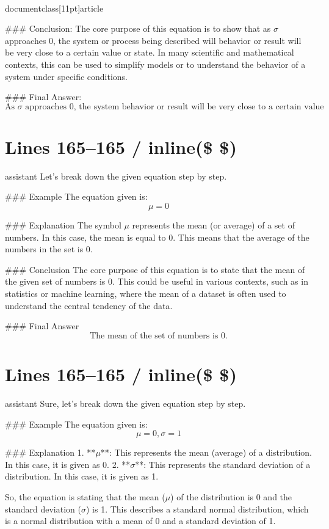 \\documentclass[11pt]{article}
\begin{document}
### Conclusion:
The core purpose of this equation is to show that as \(\sigma\) approaches 0, the system or process being described will behavior or result will be very close to a certain value or state. In many scientific and mathematical contexts, this can be used to simplify models or to understand the behavior of a system under specific conditions.

### Final Answer:
\[
\boxed{\text{As } \sigma \text{ approaches 0, the system behavior or result will be very close to a certain value or state.}}
\]


\section*{Lines 165–165 / inline(\$ \$) }
assistant
Let's break down the given equation step by step.

### Example
The equation given is:
\[
\mu = 0
\]

### Explanation
The symbol \(\mu\) represents the mean (or average) of a set of numbers. In this case, the mean is equal to 0. This means that the average of the numbers in the set is 0.

### Conclusion
The core purpose of this equation is to state that the mean of the given set of numbers is 0. This could be useful in various contexts, such as in statistics or machine learning, where the mean of a dataset is often used to understand the central tendency of the data.

### Final Answer
\[
\boxed{\text{The mean of the set of numbers is 0.}}
\]


\section*{Lines 165–165 / inline(\$ \$) }
assistant
Sure, let's break down the given equation step by step.

### Example
The equation given is:
\[
\mu = 0, \sigma = 1
\]

### Explanation
1. **\(\mu\)**: This represents the mean (average) of a distribution. In this case, it is given as 0.
2. **\(\sigma\)**: This represents the standard deviation of a distribution. In this case, it is given as 1.

So, the equation is stating that the mean (\(\mu\)) of the distribution is 0 and the standard deviation (\(\sigma\)) is 1. This describes a standard normal distribution, which is a normal distribution with a mean of 0 and a standard deviation of 1.
\end{document}
